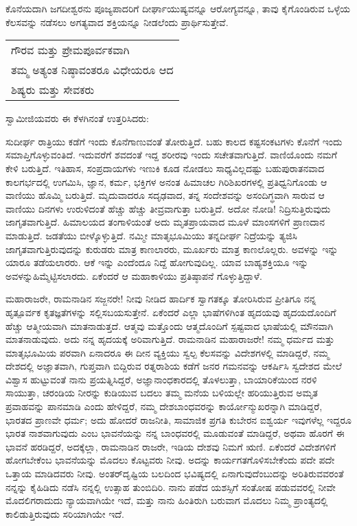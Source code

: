 ಕೊನೆಯದಾಗಿ ಜಗದೀಶ್ವರನು ಪೂಜ್ಯಪಾದರಿಗೆ ದೀರ್ಘಾಯುಷ್ಯವನ್ನೂ ಆರೋಗ್ಯವನ್ನೂ, ತಾವು ಕೈಗೊಂಡಿರುವ ಒಳ್ಳೆಯ ಕೆಲಸವನ್ನು ನಡೆಸಲು ಅಗತ್ಯವಾದ ಶಕ್ತಿಯನ್ನೂ ನೀಡಲೆಂದು ಪ್ರಾರ್ಥಿಸುತ್ತೇವೆ.

\vskip 4pt

\begin{longtable}[r]{@{}l@{}}
ಗೌರವ ಮತ್ತು ಪ್ರೇಮಪೂರ್ವಕವಾಗಿ \\
ತಮ್ಮ ಅತ್ಯಂತ ನಿಷ್ಠಾವಂತರೂ ವಿಧೇಯರೂ ಆದ \\
ಶಿಷ್ಯರು ಮತ್ತು ಸೇವಕರು \\
\end{longtable}

\newpage

ಸ್ವಾಮೀಜಿಯವರು ಈ ಕೆಳಗಿನಂತೆ ಉತ್ತರಿಸಿದರು:

ಸುದೀರ್ಘ ರಾತ್ರಿಯು ಕಡೆಗೆ ಇಂದು ಕೊನೆಗಾಣುವಂತೆ ತೋರುತ್ತಿದೆ. ಬಹು ಕಾಲದ ಕಷ್ಟಸಂಕಟಗಳು ಕೊನೆಗೆ ಇಂದು ಸಮಾಪ್ತಿಗೊಳ್ಳುವಂತಿದೆ. ಇದುವರೆಗೆ ಶವದಂತೆ ಇದ್ದ ಶರೀರವು ಇಂದು ಸಚೇತವಾಗುತ್ತಿದೆ. ವಾಣಿಯೊಂದು ನಮಗೆ ಕೇಳಿ ಬರುತ್ತಿದೆ. ಇತಿಹಾಸ, ಸಂಪ್ರದಾಯಗಳು ಇಣುಕಿ ಕೂಡ ನೋಡಲು ಸಾಧ್ಯವಿಲ್ಲದಷ್ಟು ಬಹುಪುರಾತನವಾದ ಕಾಲಗರ್ಭದಲ್ಲಿ ಉಗಮಿಸಿ, ಜ್ಞಾನ, ಕರ್ಮ, ಭಕ್ತಿಗಳ ಅನಂತ ಹಿಮಾಚಲ ಗಿರಿಶಿಖರಗಳಲ್ಲಿ ಪ್ರತಿಧ್ವನಿಗೊಂಡು ಆ ವಾಣಿಯು ಹೊಮ್ಮಿ ಬರುತ್ತಿದೆ. ಮೃದುವಾದರೂ ಸದೃಢವಾದ, ತನ್ನ ಸಂದೇಶವನ್ನು ಅಸಂದಿಗ್ಧವಾಗಿ ಸಾರುವ ಆ ವಾಣಿಯು ದಿನಗಳು ಉರುಳಿದಂತೆ ಹೆಚ್ಚು ಹೆಚ್ಚು ತೀವ್ರವಾಗುತ್ತಾ ಬರುತ್ತಿದೆ. ಅದೋ ನೋಡಿ! ನಿದ್ರಿಸುತ್ತಿರುವುದು ಜಾಗೃತವಾಗುತ್ತಿದೆ. ಹಿಮಾಲಯದ ತಂಗಾಳಿಯಂತೆ ಅದು ಮೃತಪ್ರಾಯವಾದ ಮೂಳೆ ಮಾಂಸಗಳಿಗೆ ಪ್ರಾಣದಾನ ಮಾಡುತ್ತಿದೆ. ಜಡತೆಯು ಬೀಳ್ಕೊಳ್ಳುತ್ತಿದೆ. ನಮ್ಮೀ ಮಾತೃಭೂಮಿಯು ತನ್ನದೀರ್ಘ ನಿದ್ರೆಯನ್ನು ತ್ಯಜಿಸಿ ಜಾಗೃತವಾಗುತ್ತಿರುವುದನ್ನು ಕುರುಡರು ಮಾತ್ರ ಕಾಣಲಾರರು, ಮೂರ್ಖರು ಮಾತ್ರ ಕಾಣಲೊಲ್ಲರು. ಅವಳನ್ನು ಇನ್ನು ಯಾರೂ ತಡೆಯಲಾರರು. ಆಕೆ ಇನ್ನು ಎಂದೆಂದೂ ನಿದ್ದೆ ಹೋಗುವುದಿಲ್ಲ. ಯಾವ ಬಾಹ್ಯಶಕ್ತಿಯೂ ಇನ್ನು ಅವಳನ್ನು\break ಹಿಮ್ಮೆಟ್ಟಿಸಲಾರದು. ಏಕೆಂದರೆ ಆ ಮಹಾಕಾಳಿಯು ಪ್ರತಿಷ್ಠಾಪನೆ ಗೊಳ್ಳುತ್ತಿದ್ದಾಳೆ.

ಮಹಾರಾಜರೇ, ರಾಮನಾಡಿನ ಸಜ್ಜನರೇ! ನೀವು ನೀಡಿದ ಹಾರ್ದಿಕ ಸ್ವಾಗತಕ್ಕೂ ತೋರಿಸಿರುವ ಪ್ರೀತಿಗೂ ನನ್ನ ಹೃತ್ಪೂರ್ವಕ ಕೃತಜ್ಞತೆಗಳನ್ನು ಸಲ್ಲಿಸಬಯಸುತ್ತೇನೆ. ಏಕೆಂದರೆ ಎಲ್ಲಾ ಭಾಷೆಗಳಿಗಿಂತ ಹೃದಯವು ಹೃದಯದೊಂದಿಗೆ ಹೆಚ್ಚು ಆತ್ಮೀಯವಾಗಿ ಮಾತನಾಡುತ್ತದೆ. ಆತ್ಮವು ಮತ್ತೊಂದು ಆತ್ಮದೊಂದಿಗೆ ಸ್ಪಷ್ಟವಾದ ಭಾಷೆಯಲ್ಲಿ ಮೌನವಾಗಿ ಮಾತನಾಡುವುದು. ಅದು ನನ್ನ ಹೃದಯಕ್ಕೆ ಅರಿವಾಗುತ್ತಿದೆ. ರಾಮನಾಡಿನ ಮಹಾರಾಜರೇ! ನಮ್ಮ ಧರ್ಮದ ಮತ್ತು ಮಾತೃಭೂಮಿಯ ಪರವಾಗಿ ಏನಾದರೂ ಈ ದೀನ ವ್ಯಕ್ತಿಯು ಸ್ವಲ್ಪ ಕೆಲಸವನ್ನು ವಿದೇಶಗಳಲ್ಲಿ ಮಾಡಿದ್ದರೆ, ನಮ್ಮ ದೇಶದಲ್ಲಿ ಅಜ್ಞಾತವಾಗಿ, ಗುಪ್ತವಾಗಿ ಬಿದ್ದಿರುವ ರತ್ನರಾಶಿಯ ಕಡೆಗೆ ಜನರ ಗಮನವನ್ನು ಆಕರ್ಷಿಸಿ ಸ್ವದೇಶದ ಮೇಲೆ ವಿಶ್ವಾಸ ಹುಟ್ಟುವಂತೆ ನಾನು ಪ್ರಯತ್ನಿಸಿದ್ದರೆ, ಅಜ್ಞಾನಾಂಧಕಾರದಲ್ಲಿ ತೊಳಲುತ್ತಾ, ಬಾಯಾರಿಕೆಯಿಂದ ನರಳಿ ಸಾಯುತ್ತಾ, ಚರಂಡಿಯ ನೀರನ್ನು ಕುಡಿಯುವ ಬದಲು ತಮ್ಮ ಮನೆಯ ಬಳಿಯಲ್ಲೇ ಹರಿಯುತ್ತಿರುವ ಅಮೃತ ಪ್ರವಾಹವನ್ನು ಪಾನಮಾಡಿ ಎಂದು ಹೇಳಿದ್ದರೆ, ನಮ್ಮ ದೇಶಬಾಂಧವರನ್ನು ಕಾರ್ಯೋನ್ಮುಖರನ್ನಾಗಿ ಮಾಡಿದ್ದರೆ, ಭಾರತದ ಪ್ರಾಣವೇ ಧರ್ಮ; ಅದು ಹೋದರೆ ರಾಜನೀತಿ, ಸಾಮಾಜಿಕ ಪ್ರಗತಿ ಕುಬೇರನ ಐಶ್ವರ್ಯ ಇವುಗಳೆಲ್ಲ ಇದ್ದರೂ ಭಾರತ ನಾಶವಾಗುವುದು ಎಂಬ ಭಾವನೆಯನ್ನು ನನ್ನ ಬಾಂಧವರಲ್ಲಿ ಮೂಡುವಂತೆ ಮಾಡಿದ್ದರೆ, ಅಥವಾ ಹೊರಗೆ ಈ ಭಾವನೆ ಹರಡಿದ್ದರೆ, ಅದಕ್ಕೆಲ್ಲಾ, ರಾಮನಾಡಿನ ರಾಜರೇ, ಇಡಿಯ ದೇಶವು ನಿಮಗೆ ಋಣಿ. ಏಕೆಂದರೆ ವಿದೇಶಗಳಿಗೆ ಹೋಗಬೇಕೆಂಬ ಭಾವನೆಯನ್ನು ಮೊದಲು ಕೊಟ್ಟವರು ನೀವು. ಅದನ್ನು ಕಾರ್ಯಗತಗೊಳಿಸಬೇಕೆಂದು ಪದೇ ಪದೇ ಒತ್ತಾಯ ಮಾಡಿದವರು ನೀವು. ಅಂತರ್​ದೃಷ್ಟಿಯ ಬಲದಿಂದ ಭವಿಷ್ಯದಲ್ಲಿ ಏನಾಗುವುದೆಂಬುದನ್ನು ಅರಿತಿರುವವರಂತೆ ನನ್ನನ್ನು ಕೈಹಿಡಿದು ನಡೆಸಿ ನನ್ನಲ್ಲಿ ಉತ್ಸಾಹ ತುಂಬಿದಿರಿ. ನಾನು ಪಡೆದ ಯಶಸ್ಸಿಗೆ ಸಂತೋಷ ಪಡುವವರಲ್ಲಿ ನೀವೇ ಮೊದಲಿಗರಾದುದು ನ್ಯಾಯವಾಗಿಯೇ ಇದೆ, ಮತ್ತು ನಾನು ಹಿಂತಿರುಗಿ ಬರುವಾಗ ಮೊದಲು ನಿಮ್ಮ ಪ್ರಾಂತ್ಯದಲ್ಲಿ ಕಾಲಿಡುತ್ತಿರುವುದು ಸರಿಯಾಗಿಯೇ ಇದೆ.

